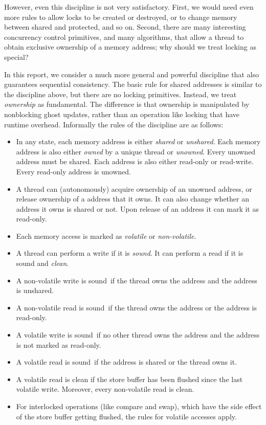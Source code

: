 \documentclass[11pt]{llncs}
\newcommand{\Sound}{sound}
\newcommand{\Def}[1]{\emph{#1}}
\begin{document}
However, even this discipline is not very satisfactory. First, we would
need even more rules to allow locks to be created or destroyed, or to
change memory between shared and protected, and so on.  Second, there
are many interesting concurrency control primitives, and many
algorithms, that allow a thread to obtain exclusive ownership of a
memory address; why should we treat locking as special?

In this report, we consider a much more general and powerful
discipline that also guarantees sequential consistency. The basic rule
for shared addresses is similar to the discipline above, but there are
no locking primitives. Instead, we treat \Def{ownership} as
fundamental. The difference is that ownership is manipulated by
nonblocking ghost updates, rather than an operation like locking that
have runtime overhead. Informally the rules of the discipline are as
follows:
\begin{itemize}
\item In any state, each memory address is either \Def{shared} or
  \Def{unshared}. Each memory address is also either \Def{owned} by a
  unique thread or \Def{unowned}. Every unowned address must be
  shared. Each address is also either read-only or read-write.
  Every read-only address is unowned.
\item A thread can (autonomously) acquire ownership of an unowned
  address, or release ownership of a address that it owns. It can also
  change whether an address it owns is shared or not. Upon release of
  an address it can mark it as read-only.
\item Each memory access is marked as \Def{volatile} or
  \Def{non-volatile}.
\item A thread can perform a write if it is \Def{\Sound}. It can
  perform a read if it is sound and \Def{clean}.
\item A non-volatile write is \Sound\ if the thread owns the address
  and the address is unshared.
\item A non-volatile read is \Sound\ if the thread owns the address or the address is read-only.
\item A volatile write is \Sound\ if no other thread owns the address
  and the address is not marked as read-only.
\item A volatile read is \Sound\ if the address is shared or the thread owns it.
\item A volatile read is clean if the store buffer has been flushed since the
  last volatile write.  Moreover, every non-volatile read is clean.
\item For interlocked operations (like compare and swap), which have
  the side effect of the store buffer getting flushed, the rules for
  volatile accesses apply.
\end{itemize}
\end{document}
